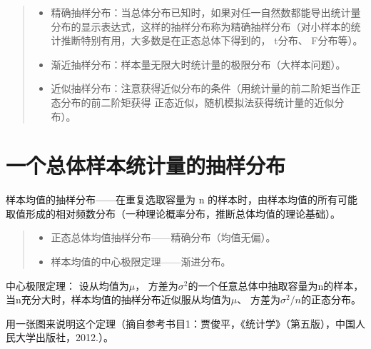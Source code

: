 \documentclass[]{ctexbook}
\providecommand{\tightlist}{%
  \setlength{\itemsep}{0pt}\setlength{\parskip}{0pt}}
\begin{document}
\begin{quote}
\begin{itemize}
\tightlist
\item
  精确抽样分布：当总体分布已知时，如果对任一自然数都能导出统计量分布的显示表达式，这样的抽样分布称为精确抽样分布（对小样本的统计推断特别有用，大多数是在正态总体下得到的， t分布、 F分布等）。
\item
  渐近抽样分布：样本量无限大时统计量的极限分布（大样本问题）。
\item
  近似抽样分布：注意获得近似分布的条件（用统计量的前二阶矩当作正态分布的前二阶矩获得
  正态近似，随机模拟法获得统计量的近似分布）。
\end{itemize}
\end{quote}

\hypertarget{ux4e00ux4e2aux603bux4f53ux6837ux672cux7edfux8ba1ux91cfux7684ux62bdux6837ux5206ux5e03}{%
\section{一个总体样本统计量的抽样分布}\label{ux4e00ux4e2aux603bux4f53ux6837ux672cux7edfux8ba1ux91cfux7684ux62bdux6837ux5206ux5e03}}

样本均值的抽样分布------在重复选取容量为 n 的样本时，由样本均值的所有可能取值形成的相对频数分布（一种理论概率分布，推断总体均值的理论基础）。

\begin{quote}
\begin{itemize}
\tightlist
\item
  正态总体均值抽样分布------精确分布（均值无偏）。
\item
  样本均值的中心极限定理------渐进分布。
\end{itemize}
\end{quote}

中心极限定理：
设从均值为\(\mu\)， 方差为\(\sigma^2\)的一个任意总体中抽取容量为n的样本，当n充分大时，样本均值的抽样分布近似服从均值为\(\mu\)、 方差为\(\sigma^2/n\)的正态分布。

用一张图来说明这个定理（摘自参考书目1：贾俊平，《统计学》（第五版），中国人民大学出版社，2012.）。
\end{document}
